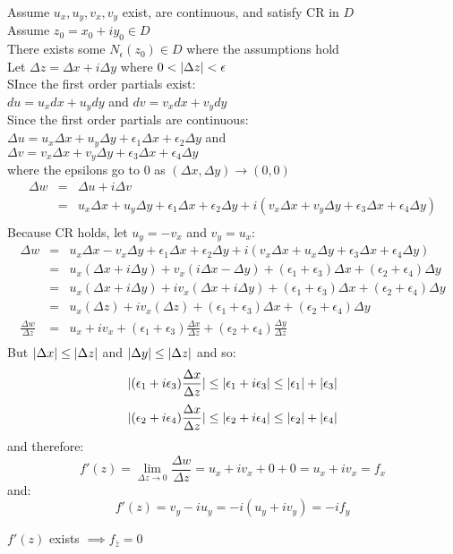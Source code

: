 \documentclass[letterpaper,12pt,fleqn]{article}
\newcommand{\e}{\epsilon}
\newcommand{\D}{\Delta}
\newcommand{\Dx}{\D x}
\newcommand{\Dy}{\D y}
\newcommand{\Dz}{\D z}
\newcommand{\Du}{\D u}
\newcommand{\Dv}{\D v}
\newcommand{\Dw}{\D w}
\newcommand{\limDz}{\lim_{\Dz\to 0}}
\newcommand{\zb}{\bar{z}}
\begin{document}
\begin{theproof}
  Assume $u_x,u_y,v_x,v_y$ exist, are continuous, and satisfy CR in $D$ \\
  Assume $z_0=x_0+iy_0\in D$ \\
  There exists some $N_{\e}(z_0)\in D$ where the assumptions hold \\
  Let $\Dz=\Dx+i\Dy$ where $0<\abs{\Dz}<\e$ \\
  SInce the first order partials exist: \\
  $du=u_xdx+u_ydy$ and $dv=v_xdx+v_ydy$ \\
  Since the first order partials are continuous: \\
  $\Du=u_x\Dx+u_y\Dy+\e_1\Dx+\e_2\Dy$ and \\
  $\Dv=v_x\Dx+v_y\Dy+\e_3\Dx+\e_4\Dy$ \\
  where the epsilons go to $0$ as $(\Dx,\Dy)\to(0,0)$ \\
  \begin{eqnarray*}
    \Dw &=& \Du+i\Dv \\
    &=& u_x\Dx+u_y\Dy+\e_1\Dx+\e_2\Dy+i(v_x\Dx+v_y\Dy+\e_3\Dx+\e_4\Dy) \\
  \end{eqnarray*}
  Because CR holds, let $u_y=-v_x$ and $v_y=u_x$:
  \begin{eqnarray*}
    \Dw &=& u_x\Dx-v_x\Dy+\e_1\Dx+\e_2\Dy+i(v_x\Dx+u_x\Dy+\e_3\Dx+\e_4\Dy) \\
    &=& u_x(\Dx+i\Dy)+v_x(i\Dx-\Dy)+(\e_1+\e_3)\Dx+(\e_2+\e_4)\Dy \\
    &=& u_x(\Dx+i\Dy)+iv_x(\Dx+i\Dy)+(\e_1+\e_3)\Dx+(\e_2+\e_4)\Dy \\
    &=& u_x(\Dz)+iv_x(\Dz)+(\e_1+\e_3)\Dx+(\e_2+\e_4)\Dy \\
    \frac{\Dw}{\Dz} &=& u_x+iv_x+(\e_1+\e_3)\frac{\Dx}{\Dz}+
    (\e_2+\e_4)\frac{\Dy}{\Dz} \\
  \end{eqnarray*}
  But $\abs{\Dx}\le\abs{\Dz}$ and $\abs{\Dy}\le\abs{\Dz}$ and so:
  \[\abs{(\e_1+i\e_3)\frac{\Dx}{\Dz}}\le\abs{\e_1+i\e_3}\le
  \abs{\e_1}+\abs{\e_3}\]
  \[\abs{(\e_2+i\e_4)\frac{\Dx}{\Dz}}\le\abs{\e_2+i\e_4}\le
  \abs{\e_2}+\abs{\e_4}\]
  and therefore:
  \[f'(z)=\limDz{\frac{\Dw}{\Dz}}=u_x+iv_x+0+0=u_x+iv_x=f_x\]
  and:
  \[f'(z)=v_y-iu_y=-i(u_y+iv_y)=-if_y\]
\end{theproof}

\begin{theorem}
  $f'(z)$ exists $\implies f_{\zb}=0$
\end{theorem}
\end{document}
